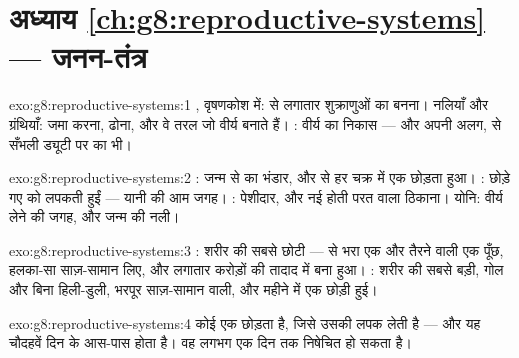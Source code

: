 \section*{अध्याय \ref{ch:g8:reproductive-systems} --- जनन-तंत्र}

\begin{solution}{exo:g8:reproductive-systems:1}
, वृषणकोश में:  से लगातार शुक्राणुओं का बनना। नलियाँ और
ग्रंथियाँ: जमा करना, ढोना, और वे तरल जो वीर्य बनाते हैं। : वीर्य का
निकास --- और अपनी अलग,  से सँभली ड्यूटी पर  का भी।
\end{solution}

\begin{solution}{exo:g8:reproductive-systems:2}
: जन्म से  का भंडार, और  से हर चक्र में एक छोड़ता
हुआ। : छोड़े गए  को लपकती हुईं --- यानी  की आम
जगह। : पेशीदार, और नई होती परत वाला ठिकाना। योनि: वीर्य लेने की
जगह, और जन्म की नली।
\end{solution}

\begin{solution}{exo:g8:reproductive-systems:3}
: शरीर की सबसे छोटी  ---  से भरा एक  और तैरने
वाली एक पूँछ, हलका-सा साज़-सामान लिए, और लगातार करोड़ों की तादाद में
बना हुआ। : शरीर की सबसे बड़ी, गोल और बिना हिली-डुली, भरपूर
साज़-सामान वाली, और महीने में एक छोड़ी हुई।
\end{solution}

\begin{solution}{exo:g8:reproductive-systems:4}
कोई  एक  छोड़ता है, जिसे उसकी  लपक लेती है ---
और यह चौदहवें दिन के आस-पास होता है। वह लगभग एक दिन तक निषेचित हो सकता
है।
\end{solution}

